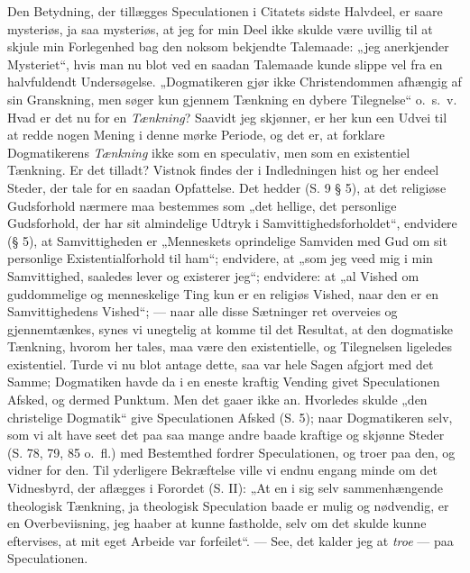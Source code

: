  Den Betydning, der tillægges Speculationen i Citatets sidste
Halvdeel, er saare mysteriøs, ja saa mysteriøs, at jeg for min
Deel ikke skulde være uvillig til at skjule min Forlegenhed bag
den noksom bekjendte Talemaade: „jeg anerkjender Mysteriet“, hvis
man nu blot ved en saadan Talemaade kunde slippe vel fra en
halvfuldendt Undersøgelse. „Dogmatikeren gjør ikke Christendommen
afhængig af sin Granskning, men søger kun gjennem Tænkning en
dybere Tilegnelse“ o.\ s.\ v. Hvad er det nu for en
\emph{Tænkning}? Saavidt jeg skjønner, er her kun een Udvei til at
redde nogen Mening i denne mørke Periode, og det er, at forklare
Dogmatikerens \emph{Tænkning} ikke som en speculativ, men som en
existentiel Tænkning. Er det tilladt? Vistnok findes der i
Indledningen hist og her endeel Steder, der tale for en saadan
Opfattelse. Det hedder (S. 9 § 5), at det religiøse Gudsforhold
nærmere maa bestemmes som „det hellige, det personlige
Gudsforhold, der har sit almindelige Udtryk i
Samvittighedsforholdet“, endvidere (§ 5), at Samvittigheden er
„Menneskets oprindelige Samviden med Gud om sit personlige
Existentialforhold til ham“; endvidere, at „som jeg veed mig i min
Samvittighed, saaledes lever og existerer jeg“; endvidere: at „al
Vished om guddommelige og menneskelige Ting kun er en religiøs
Vished, naar den er en Samvittighedens Vished“; --- naar alle
disse Sætninger ret overveies og gjennemtænkes, synes vi unegtelig
at komme til det Resultat, at den dogmatiske Tænkning, hvorom her
tales, maa
 være den existentielle, og Tilegnelsen ligeledes existentiel.
Turde vi nu blot antage dette, saa var hele Sagen afgjort med det
Samme; Dogmatiken havde da i en eneste kraftig Vending givet
Speculationen Afsked, og dermed Punktum. Men det gaaer ikke an.
Hvorledes skulde „den christelige Dogmatik“ give Speculationen
Afsked (S. 5); naar Dogmatikeren selv, som vi alt have seet det
paa saa mange andre baade kraftige og skjønne Steder (S. 78, 79,
85 o.\ fl.) med Bestemthed fordrer Speculationen, og troer paa
den, og vidner for den. Til yderligere Bekræftelse ville vi endnu
engang minde om det Vidnesbyrd, der aflægges i Forordet (S. II):
„At en i sig selv sammenhængende theologisk Tænkning, ja
theologisk Speculation baade er mulig og nødvendig, er en
Overbeviisning, jeg haaber at kunne fastholde, selv om det skulde
kunne eftervises, at mit eget Arbeide var forfeilet“. --- See, det
kalder jeg at \emph{troe} --- paa Speculationen.

